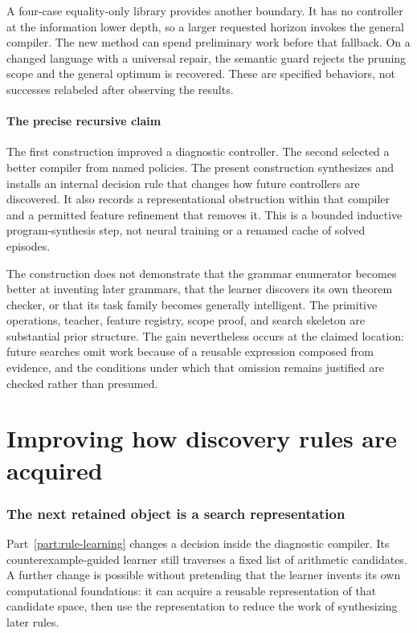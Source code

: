 \documentclass[11pt,letterpaper]{article}
\theoremstyle{plain}
\theoremstyle{definition}
\begin{document}
A four-case equality-only library provides another boundary. It has no controller at the information lower depth, so a larger requested horizon invokes the general compiler. The new method can spend preliminary work before that fallback. On a changed language with a universal repair, the semantic guard rejects the pruning scope and the general optimum is recovered. These are specified behaviors, not successes relabeled after observing the results.



\subsection{The precise recursive claim}
The first construction improved a diagnostic controller. The second selected a better compiler from named policies. The present construction synthesizes and installs an internal decision rule that changes how future controllers are discovered. It also records a representational obstruction within that compiler and a permitted feature refinement that removes it. This is a bounded inductive program-synthesis step, not neural training or a renamed cache of solved episodes.

The construction does not demonstrate that the grammar enumerator becomes better at inventing later grammars, that the learner discovers its own theorem checker, or that its task family becomes generally intelligent. The primitive operations, teacher, feature registry, scope proof, and search skeleton are substantial prior structure. The gain nevertheless occurs at the claimed location: future searches omit work because of a reusable expression composed from evidence, and the conditions under which that omission remains justified are checked rather than presumed.


\clearpage\part{Improving how discovery rules are acquired}\label{part:meta-acquisition}
\section{The next retained object is a search representation}\label{sec:meta-acquisition}
Part~\ref{part:rule-learning} changes a decision inside the diagnostic compiler. Its counterexample-guided learner still traverses a fixed list of arithmetic candidates. A further change is possible without pretending that the learner invents its own computational foundations: it can acquire a reusable representation of that candidate space, then use the representation to reduce the work of synthesizing later rules.
\end{document}
